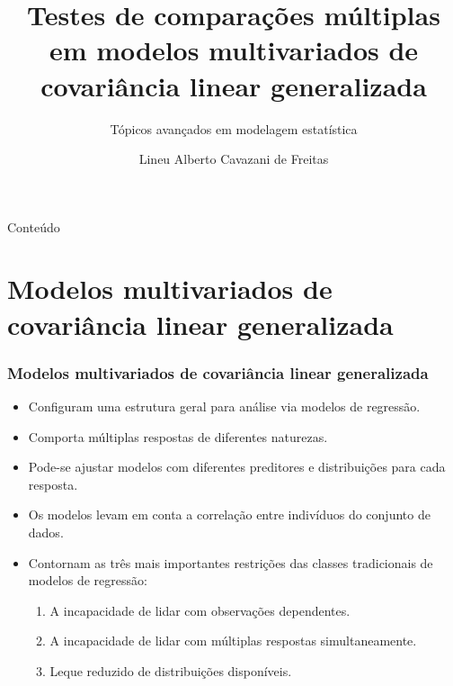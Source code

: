 \documentclass[10pt,
  aspectratio=169,
  serif,
  mathserif,
  professionalfont,
  compress,
  handout,
  ]{beamer}\usepackage[]{graphicx}\usepackage[]{color}
\title[]{
  \Large Testes de comparações múltiplas em modelos multivariados de covariância linear generalizada}
\subtitle{\vspace{0.5cm}Tópicos avançados em modelagem estatística}
\author[Lineu Alberto]{\small
  Lineu Alberto Cavazani de Freitas
}
\institute[UFPR]{
 Trabalho final\\

\vspace{1em}
   Universidade Federal do Paraná
% 
 }
\date{}
\begin{document}
\frame{\titlepage}

 \begin{frame}{Conteúdo}
   \small{\tableofcontents}
 \end{frame}





\section{Modelos multivariados de covariância linear generalizada}

\begin{frame}

\frametitle{Modelos multivariados de covariância linear generalizada}

\begin{itemize}
   
   \itemsep 2ex
   
  \item Configuram uma estrutura geral para análise via modelos de regressão.
  
  \item Comporta múltiplas respostas de diferentes naturezas.
  
    \item Pode-se ajustar modelos com diferentes preditores e distribuições para cada resposta.
  
  \item Os modelos levam em conta a correlação entre indivíduos do conjunto de dados. 

  \item Contornam as três mais importantes restrições das classes tradicionais de modelos de regressão:
  
    \begin{enumerate}
    
      \item A incapacidade de lidar com observações dependentes. 
      \item A incapacidade de lidar com múltiplas respostas simultaneamente.
      \item Leque reduzido de distribuições disponíveis. 

    \end{enumerate}

\end{itemize}

\end{frame}
\end{document}
